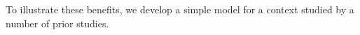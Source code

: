  
To illustrate these benefits, we develop a simple model for a context studied by a number of prior studies.

% 
%
%
